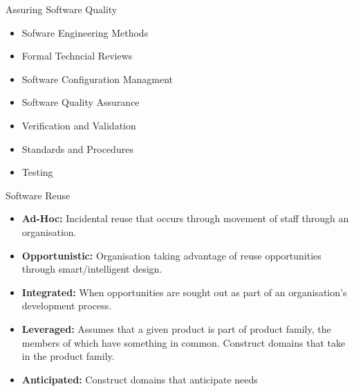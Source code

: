 \documentclass[aspectratio=1610,xcolor=dvipsnames,t,compress]{beamer}
\begin{document}
\begin{frame}{Assuring Software Quality} 
    \begin{itemize}
        \item Sofware Engineering Methods
        \item Formal Techncial Reviews
        \item Software Configuration Managment
        \item Software Quality Assurance
        \item Verification and Validation
        \item Standards and Procedures
        \item Testing
    \end{itemize}
\end{frame}

\begin{frame}{Software Reuse} 
    \begin{itemize}
        \item \textbf{Ad-Hoc:} Incidental reuse that occurs through 
              movement of staff through an organisation.
        \item \textbf{Opportunistic:} Organisation taking advantage of reuse 
              opportunities through smart/intelligent design.
          \item \textbf{Integrated:} When opportunities are sought out as 
              part of an organisation’s development process.
          \item \textbf{Leveraged:} Assumes that a given product is part of 
              product family, the members of which have something in common. 
              Construct domains that take in the product family.
          \item \textbf{Anticipated:} Construct domains that anticipate needs
    \end{itemize}
\end{frame} 
\end{document}
